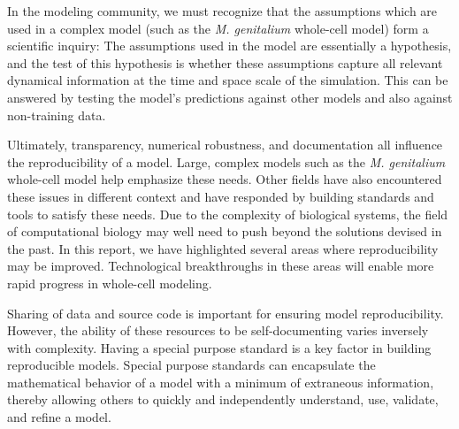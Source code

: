 \documentclass[journal,transmag,twoside]{IEEEtran}
\begin{document}
In the modeling community, we must recognize that the assumptions which
are used in a complex model (such as the \textit{M. genitalium} whole-cell model)
form a scientific inquiry: The assumptions used in the model are
essentially a hypothesis, and the test of this hypothesis is whether
these assumptions capture all relevant dynamical information
at the time and space scale of the simulation.
This can be answered by testing the model's predictions against other
models and also against non-training data.

Ultimately, transparency, numerical robustness, and documentation all influence the reproducibility
of a model. Large, complex models such as the \textit{M. genitalium} whole-cell model
help emphasize these needs.
Other fields have also encountered these issues in different context and have
responded by building standards and tools to satisfy these needs.
Due to the complexity of biological systems, the field of computational biology
may well need to push beyond the solutions devised in the past.
In this report, we have highlighted several areas where reproducibility may be improved.
Technological breakthroughs in these areas will enable more rapid progress in whole-cell modeling.

Sharing of data and source code is important for ensuring model reproducibility.
However, the ability of these resources to be self-documenting varies inversely
with complexity.
Having a special purpose standard is a key factor in building reproducible models.
Special purpose standards can encapsulate the mathematical behavior of a model
with a minimum of extraneous information, thereby allowing others to
quickly and independently understand, use, validate, and refine a model.


\ifCLASSOPTIONcaptionsoff
  \newpage
\fi



\end{document}
